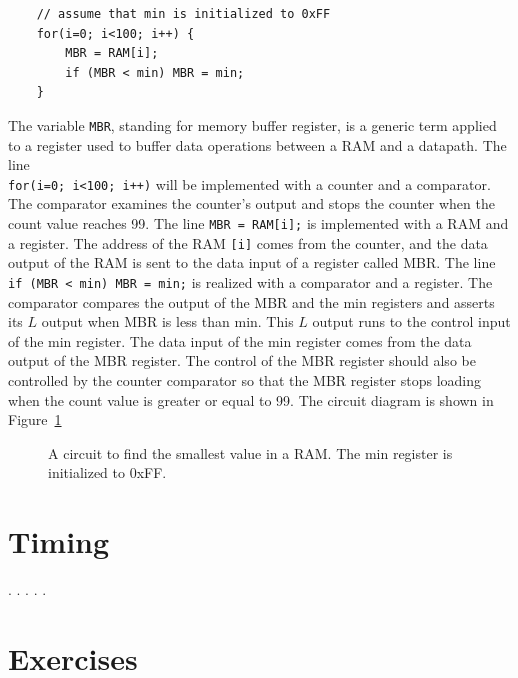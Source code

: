 \begin{verbatim}
    // assume that min is initialized to 0xFF
    for(i=0; i<100; i++) {
        MBR = RAM[i];
        if (MBR < min) MBR = min;
    }
\end{verbatim}

The variable \verb+MBR+, standing for memory buffer register, is a generic
term applied to a register used to buffer data operations between a RAM and 
a datapath.  The line \\
\verb^for(i=0; i<100; i++)^ will be implemented with a 
counter and a comparator.  The comparator examines the counter's output and  
stops the counter when the count value reaches 99.  The line 
\verb+MBR = RAM[i];+ is implemented with a RAM and a register.  The address
of the RAM \verb+[i]+ comes from the counter, and the data output of the RAM
is sent to the data input of a register called MBR.  The line 
\verb+if (MBR < min) MBR = min;+ is realized with a comparator and 
a register.  The comparator compares the output of the MBR and the min
registers and asserts its $L$ output when MBR is less than min.  This 
$L$ output runs to the control input of the min register.  The data 
input of the min register comes from the data output of the MBR 
register.  The control of the MBR register should also be controlled 
by the counter comparator so that the MBR register stops loading when 
the count value is greater or equal to 99.  The circuit diagram is 
shown in Figure~\ref{fig:min} 

\begin{figure}[ht]
\caption{A circuit to find the smallest value in a RAM.  The min 
register is initialized to 0xFF.}
\label{fig:min}
\end{figure}

\section{Timing}
\pagebreak
.
\pagebreak
.
\pagebreak
.
\pagebreak
.
\pagebreak
.

\section{Exercises}


